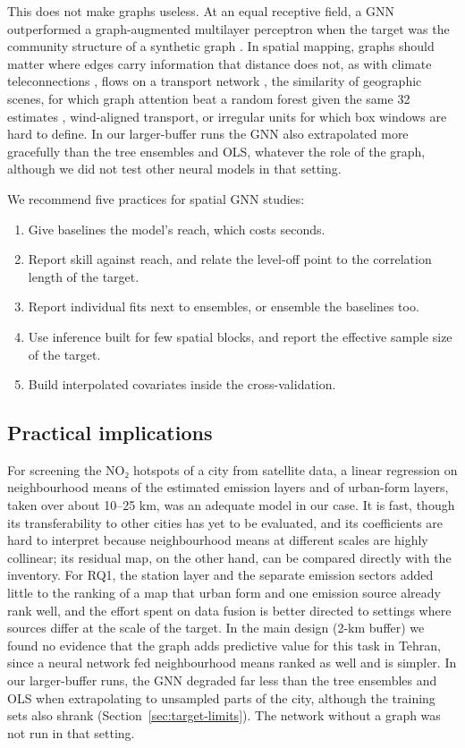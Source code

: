 \documentclass[pdflatex,sn-basic]{sn-jnl}
\begin{document}
This does not make graphs useless. At an equal receptive field, a GNN outperformed a graph-augmented multilayer perceptron when the target was the community structure of a synthetic graph \citep{chen2021}. In spatial mapping, graphs should matter where edges carry information that distance does not, as with climate teleconnections \citep{chen2026}, flows on a transport network \citep{mohseni2026}, the similarity of geographic scenes, for which graph attention beat a random forest given the same 32 estimates \citep{bai2025}, wind-aligned transport, or irregular units for which box windows are hard to define. In our larger-buffer runs the GNN also extrapolated more gracefully than the tree ensembles and OLS, whatever the role of the graph, although we did not test other neural models in that setting.

We recommend five practices for spatial GNN studies:
\begin{enumerate}[1.]
\item Give baselines the model's reach, which costs seconds.
\item Report skill against reach, and relate the level-off point to the correlation length of the target.
\item Report individual fits next to ensembles, or ensemble the baselines too.
\item Use inference built for few spatial blocks, and report the effective sample size of the target.
\item Build interpolated covariates inside the cross-validation.
\end{enumerate}

\subsection{Practical implications}\label{sec:practical}

For screening the NO₂ hotspots of a city from satellite data, a linear regression on neighbourhood means of the estimated emission layers and of urban-form layers, taken over about 10--25 km, was an adequate model in our case. It is fast, though its transferability to other cities has yet to be evaluated, and its coefficients are hard to interpret because neighbourhood means at different scales are highly collinear; its residual map, on the other hand, can be compared directly with the inventory. For RQ1, the station layer and the separate emission sectors added little to the ranking of a map that urban form and one emission source already rank well, and the effort spent on data fusion is better directed to settings where sources differ at the scale of the target. In the main design (2-km buffer) we found no evidence that the graph adds predictive value for this task in Tehran, since a neural network fed neighbourhood means ranked as well and is simpler. In our larger-buffer runs, the GNN degraded far less than the tree ensembles and OLS when extrapolating to unsampled parts of the city, although the training sets also shrank (Section~\ref{sec:target-limits}). The network without a graph was not run in that setting.
\end{document}

